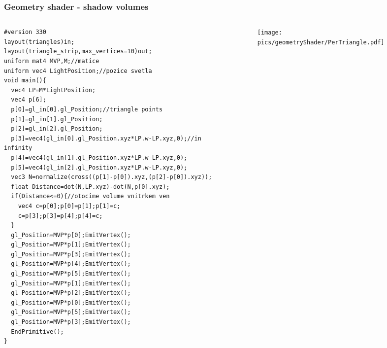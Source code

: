 \begin{frame}[fragile]
\frametitle{Geometry shader - shadow volumes}
  \begin{columns}[T]
    \begin{column}{.44\textwidth}
	    {\tiny
\begin{verbatim}
#version 330
layout(triangles)in;
layout(triangle_strip,max_vertices=10)out;
uniform mat4 MVP,M;//matice
uniform vec4 LightPosition;//pozice svetla
void main(){
  vec4 LP=M*LightPosition;
  vec4 p[6];
  p[0]=gl_in[0].gl_Position;//triangle points
  p[1]=gl_in[1].gl_Position;
  p[2]=gl_in[2].gl_Position;
  p[3]=vec4(gl_in[0].gl_Position.xyz*LP.w-LP.xyz,0);//in infinity
  p[4]=vec4(gl_in[1].gl_Position.xyz*LP.w-LP.xyz,0);
  p[5]=vec4(gl_in[2].gl_Position.xyz*LP.w-LP.xyz,0);
  vec3 N=normalize(cross((p[1]-p[0]).xyz,(p[2]-p[0]).xyz));
  float Distance=dot(N,LP.xyz)-dot(N,p[0].xyz);
  if(Distance<=0){//otocime volume vnitrkem ven
    vec4 c=p[0];p[0]=p[1];p[1]=c;
    c=p[3];p[3]=p[4];p[4]=c;
  }
  gl_Position=MVP*p[0];EmitVertex();
  gl_Position=MVP*p[1];EmitVertex();
  gl_Position=MVP*p[3];EmitVertex();
  gl_Position=MVP*p[4];EmitVertex();
  gl_Position=MVP*p[5];EmitVertex();
  gl_Position=MVP*p[1];EmitVertex();
  gl_Position=MVP*p[2];EmitVertex();
  gl_Position=MVP*p[0];EmitVertex();
  gl_Position=MVP*p[5];EmitVertex();
  gl_Position=MVP*p[3];EmitVertex();
  EndPrimitive();
}
    	\end{verbatim}
   	}
    \end{column}
    \begin{column}{.48\textwidth}
	    \begin{figure}[h]
    		\texttt{[image: pics/geometryShader/PerTriangle.pdf]}
    	\end{figure}
    \end{column}
  \end{columns}

\end{frame}


